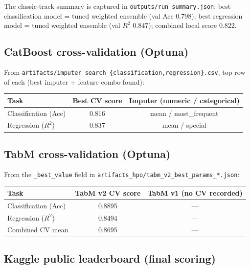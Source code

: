 \documentclass[11pt,a4paper]{article}
\begin{document}
The classic-track summary is captured in \texttt{outputs/run\_summary.json}: best classification model = tuned weighted ensemble (val Acc 0.798); best regression model = tuned weighted ensemble (val $R^2$ 0.847); combined local score 0.822.

\subsection{CatBoost cross-validation (Optuna)}

From \texttt{artifacts/imputer\_search\_\{classification,regression\}.csv}, top row of each (best imputer + feature combo found):

\begin{table}[h]
\centering
\small
\begin{tabular}{lcc}
\toprule
\textbf{Task} & \textbf{Best CV score} & \textbf{Imputer (numeric / categorical)} \\
\midrule
Classification (Acc) & 0.816 & mean / most\_frequent \\
Regression ($R^2$) & 0.837 & mean / special \\
\bottomrule
\end{tabular}
\end{table}

\subsection{TabM cross-validation (Optuna)}

From the \texttt{\_best\_value} field in \texttt{artifacts\_hpo/tabm\_v2\_best\_params\_*.json}:

\begin{table}[h]
\centering
\small
\begin{tabular}{lcc}
\toprule
\textbf{Task} & \textbf{TabM v2 CV score} & \textbf{TabM v1 (no CV recorded)} \\
\midrule
Classification (Acc) & 0.8895 & --- \\
Regression ($R^2$) & 0.8494 & --- \\
Combined CV mean & 0.8695 & --- \\
\bottomrule
\end{tabular}
\end{table}

\subsection{Kaggle public leaderboard (final scoring)}
\end{document}
